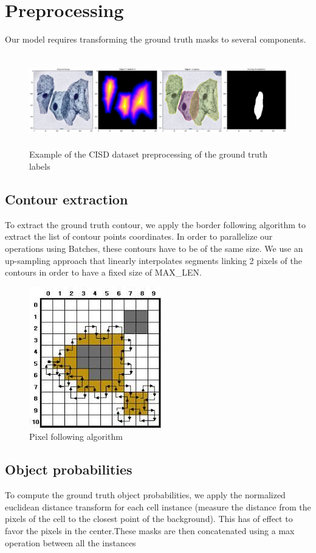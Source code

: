 \documentclass[main.tex]{subfiles}
\begin{document}
\section{Preprocessing}
Our model requires transforming the ground truth masks to several components.

\begin{figure}[H]
    \centering
    \includegraphics[height=4cm]{presentationImages/overlap.png}
    \caption{Example of the CISD dataset preprocessing of the ground truth labels}
\end{figure}

\subsection{Contour extraction}
To extract the ground truth contour, we apply the border following algorithm to extract the list of contour points coordinates. In order to parallelize our operations using Batches, these contours have to be of the same size. We use an up-sampling approach that linearly interpolates segments linking 2 pixels of the contours in order to have a fixed size of MAX\_LEN.  

\begin{figure}[H]
    \centering
    \includegraphics{presentationImages/borderfol.jpg}
    \caption{Pixel following algorithm}
\end{figure}

\subsection{Object probabilities}
To compute the ground truth object probabilities, we apply the normalized euclidean distance transform for each cell instance (measure the distance from the pixels of the cell to the closest point of the background). This has of effect to favor the pixels in the center.These masks are then concatenated using a max operation between all the instances 
\end{document}
